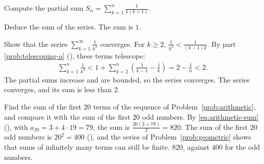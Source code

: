 \begin{subproblem}
{
Compute the partial sum $S_n = \sum_{k=1}^{n} \frac{1}{k (k + 1)}$.
}{}{}
\end{subproblem}

\begin{subproblem}[done]
{
Deduce the sum of the series.
}
{}
{
The sum is $1$.
}
\end{subproblem}


\begin{problem}
{
Show that the series $\displaystyle \sum_{k=1}^{\infty} \frac{1}{k^2}$
converges.
}
{
For $k \ge 2$, $\frac{1}{k^2} < \frac{1}{(k - 1) k}$. By part
\ref{prob:telescoping-a} (), these terms
telescope:
\begin{align*}
    \sum_{k=1}^{n} \frac{1}{k^2}
        < 1 + \sum_{k=2}^{n} \left( \frac{1}{k - 1} - \frac{1}{k} \right)
        = 2 - \frac{1}{n} < 2.
\end{align*}
The partial sums increase and are bounded, so the series converges.
}
{
The series converges, and its sum is less than $2$.
}
\end{problem}


\begin{problem}
{
Find the sum of the first $20$ terms of the sequence of
Problem~\ref{prob:arithmetic}, and compare it with the sum of the first $20$
odd numbers.
}
{
By \eqref{eq:arithmetic-sum} (), with $a_{20} = 3 + 4
\cdot 19 = 79$, the sum is $\frac{20 (3 + 79)}{2} = 820$. The sum of the first
$20$ odd numbers is $20^2 = 400$ (), and the series of
Problem~\ref{prob:geometric} shows that sums of infinitely many terms can
still be finite.
}
{
$820$, against $400$ for the odd numbers.
}
\end{problem}
